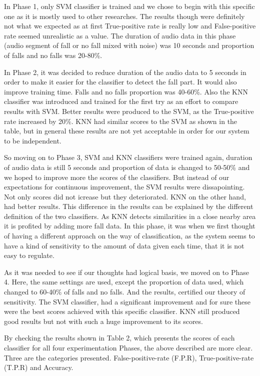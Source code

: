 \documentclass[10pt, conference, compsocconf]{IEEEtran}
\begin{document}
In Phase 1, only SVM classifier is trained and we chose to begin with this specific one as it is mostly used to other researches. The results though were definitely not what we expected as at first True-positive rate is really low and False-positive rate seemed unrealistic as a value. The duration of audio data in this phase (audio segment of fall or no fall mixed with noise) was 10 seconds and proportion of falls and no falls was 20-80\%. 

In Phase 2, it was decided to reduce duration of the audio data to 5 seconds in order to make it easier for the classifier to detect the fall part. It would also improve training time. Falls and no falls proportion was 40-60\%. Also the KNN classifier was introduced and trained for the first try as an effort to compare results with SVM. Better results were produced to the SVM, as the True-positive rate increased by 20\%. KNN had similar scores to the SVM as shown in the table, but in general these results are not yet acceptable in order for our system to be independent. 

So moving on to Phase 3, SVM and KNN classifiers were trained again, duration of audio data is still 5 seconds and proportion of data is changed to 50-50\% and we hoped to improve more the scores of the classifiers. But instead of our expectations for continuous improvement, the SVM results were dissapointing. Not only scores did not icrease but they deteriorated. KNN on the other hand, had better results. This difference in the results can be explained by the different definition of the two classifiers. As KNN detects similarities in a close nearby area it is profited by adding more fall data. In this phase, it was when we first thought of having a different approach on the way of classification, as the system seems to have a kind of sensitivity to the amount of data given each time, that it is not easy to regulate. 

As it was needed to see if our thoughts had logical basis, we moved on to Phase 4. Here, the same settings are used, except the proportion of data used, which changed to 60-40\% of falls and no falls. And the results, certified our theory of sensitivity. The SVM classifier, had a significant improvement and for sure these were the best scores achieved with this specific classifier. KNN still produced good results but not with such a huge improvement to its scores. 

By checking the results shown in Table 2, which presents the scores of each classifier for all four experimentation Phases, the above described are more clear. Three are the categories presented. False-positive-rate (F.P.R), True-positive-rate (T.P.R) and Accuracy.  
\end{document}
